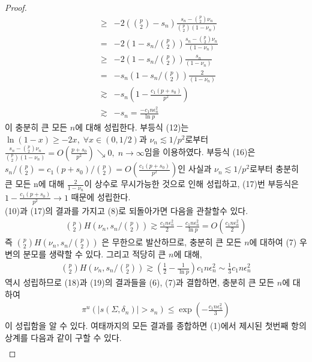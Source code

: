 \begin{proof}
\begin{eqnarray}
      &\geq& -2 \left( {p \choose 2} - s_n \right) \frac{s_n - {p \choose 2} \nu_n}{{p \choose 2}(1 - \nu_n)} \\
      &=& -2 \left( 1 - s_n / {p \choose 2} \right) \frac{s_n - {p \choose 2} \nu_n }{(1 - \nu_n)}  \\
      &\geq& -2 \left( 1 - s_n / {p \choose 2} \right) \frac{s_n }{(1 - \nu_n)} \\
      &=& -s_n \left( 1 - s_n / {p \choose 2} \right) \frac{2}{(1 - \nu_n)} \\
      &\gtrsim& -s_n \left( 1 - \frac{c_1(p + s_0)}{p^2} \right)  \\
      &\gtrsim& -s_n = \frac{- c_1 n \epsilon_n^2}{\ln{p}}
    \end{eqnarray}
    이 충분히 큰 모든 $n$에 대해 성립한다. 부등식 (12)는 $\ln{(1-x)} \geq -2x, \; \forall x \in (0, 1/2)$과 $\nu_n \lesssim 1/p^2$로부터 $\frac{s_n - {p \choose 2}\nu_n}{{p \choose 2}(1 - \nu_n)} =  O(\frac{p + s_0}{p^2}) \searrow 0, \; n \rightarrow \infty$임을 이용하였다. 부등식 (16)은 $s_n/{p \choose 2} = c_1(p + s_0) / {p \choose 2} = O(\frac{c_1(p + s_0)}{p^2})$인 사실과 $\nu_n \lesssim 1/p^2$로부터 충분히 큰 모든 n에 대해 $\frac{2}{1-\nu_n}$이 상수로 무시가능한 것으로 인해 성립하고, (17)번 부등식은 $1 - \frac{c_1(p + s_0)}{p^2} \rightarrow 1$ 때문에 성립한다. \\
    (10)과 (17)의 결과를 가지고 (8)로 되돌아가면 다음을 관찰할수 있다.
    \begin{align}
      {p \choose 2} H (\nu_n, s_n/{p \choose 2}) \gtrsim \frac{c_1 n \epsilon_n^2}{2} - \frac{c_1 n \epsilon_n^2}{\ln{p}} = O(\frac{c_1 n \epsilon_n^2}{2})
    \end{align}
    즉 ${p \choose 2} H (\nu_n, s_n/{p \choose 2})$ 은 무한으로 발산하므로, 충분히 큰 모든 $n$에 대하여 (7) 우변의 분모를 생략할 수 있다. 그리고 적당히 큰 $n$에 대해,
    \begin{align}
      {p \choose 2} H (\nu_n, s_n/{p \choose 2}) \gtrsim \left( \frac{1}{2} - \frac{1}{\ln{p}} \right) c_1 n \epsilon_n^2 \sim \frac{1}{3} c_1 n \epsilon_n^2
    \end{align}
    역시 성립하므로 (18)과 (19)의 결과들을 (6), (7)과 결합하면, 충분히 큰 모든 $n$에 대하여
    \begin{align}
      \pi^u(|s(\Sigma, \delta_n)| > s_n) \leq \exp \left( - \frac{c_1 n \epsilon_n^2}{3} \right)
    \end{align}
    이 성립함을 알 수 있다. 여태까지의 모든 결과를 종합하면 (1)에서 제시된 첫번째 항의 상계를 다음과 같이 구할 수 있다.
    \begin{eqnarray}

\end{eqnarray}
\end{proof}
